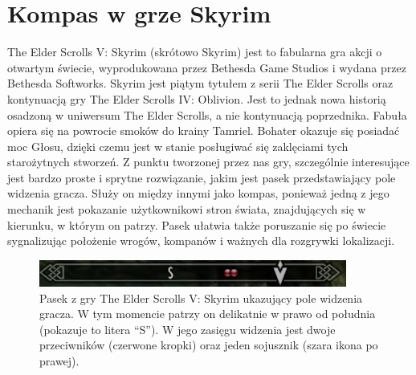 \section{Kompas w grze Skyrim}\label{chap:skrm}

The Elder Scrolls V: Skyrim (skrótowo Skyrim) jest to fabularna gra akcji o otwartym świecie, wyprodukowana przez Bethesda Game Studios i wydana przez Bethesda Softworks. Skyrim jest piątym tytułem z serii The Elder Scrolls oraz kontynuacją gry The Elder Scrolls IV: Oblivion. Jest to jednak nowa historią osadzoną w uniwersum The Elder Scrolls, a nie kontynuacją poprzednika. Fabuła opiera się na powrocie smoków do krainy Tamriel. Bohater okazuje się posiadać moc Głosu, dzięki czemu jest w stanie posługiwać się zaklęciami tych starożytnych stworzeń.
	Z punktu tworzonej przez nas gry, szczególnie interesujące jest  bardzo proste i sprytne rozwiązanie, jakim jest pasek przedstawiający pole widzenia gracza. Służy on między innymi jako kompas, ponieważ jedną z jego mechanik jest pokazanie użytkownikowi stron świata, znajdujących się w kierunku, w którym on patrzy. Pasek ułatwia także poruszanie się po świecie sygnalizując położenie wrogów, kompanów i ważnych dla rozgrywki lokalizacji.

    \begin{figure}[htbp]
        \centering
        \includegraphics[width=0.9\textwidth]{images/ui/compassSkyrim.png}
        \caption{Pasek z gry The Elder Scrolls V: Skyrim ukazujący pole widzenia gracza. W tym momencie patrzy on delikatnie w prawo od południa (pokazuje to litera “S”). W jego zasięgu widzenia jest dwoje przeciwników (czerwone kropki) oraz jeden sojusznik (szara ikona po prawej).}\label{fig:Fallout}
    \end{figure}


